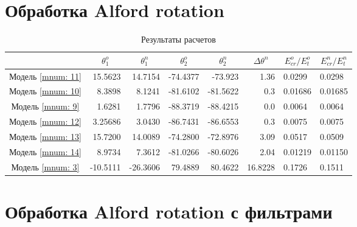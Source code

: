 \documentclass[a4paper,11pt]{article}
\begin{document}
\section{Обработка Alford rotation}

\begin{table}[h]
\footnotesize
\centering
\caption{Результаты расчетов}
\renewcommand{\arraystretch}{1.5}
\begin{tabularx}{\textwidth}{C|rr|rr|r|ll}
				& &  &  &  & &  &  \\ \hline
\hline Модель \ref{mnum: 11} & 15.5623 & 14.7154 &  -74.4377 & -73.923  & 1.36  & 0.0299 & 0.0298 \\
 	   Модель \ref{mnum: 10} & 8.3898 & 8.1241 & -81.6102 & -81.5622 & 0.3 & 0.01686 & 0.01685 \\
 	   Модель \ref{mnum: 9} & 1.6281 & 1.7796 & -88.3719  & -88.4215  & 0.0  & 0.0064 & 0.0064 \\	   
	   Модель \ref{mnum: 12} & 3.25686 & 3.0430 & -86.7431  & -86.6553  & 0.3 & 0.0075 & 0.0075 \\ 	 
	   Модель \ref{mnum: 13} & 15.7200 & 14.0089 & -74.2800  & -72.8976  & 3.09 & 0.0517 & 0.0509 \\ 	
	   Модель \ref{mnum: 14} & 8.9734 & 7.3612 & -81.0266  & -80.6026  & 2.04 & 0.01219 & 0.01150 \\
	   Модель \ref{mnum: 3} & -10.5111 & -26.3606 & 79.4889  & 80.4622  & 16.8228 & 0.1726 & 0.1511 \\
 	   \hline
\end{tabularx} 
\label{tab:std_process_results}
\renewcommand{\arraystretch}{1.0}
\end{table}

\section{Обработка Alford rotation с фильтрами}
\end{document}
